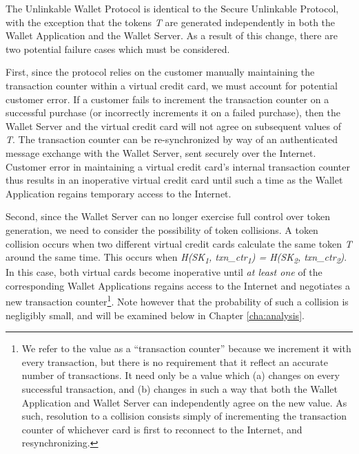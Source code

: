 The Unlinkable Wallet Protocol is identical to the Secure Unlinkable Protocol,
    with the exception that the tokens \emph{T} are generated independently in both the Wallet Application and the Wallet Server.
As a result of this change, there are two potential failure cases which must be considered.

First, since the protocol relies on the customer manually maintaining the transaction counter within a virtual credit card,
    we must account for potential customer error.
If a customer fails to increment the transaction counter on a successful purchase (or incorrectly increments it on a failed purchase),
    then the Wallet Server and the virtual credit card will not agree on subsequent values of \emph{T}.
The transaction counter can be re-synchronized by way of an authenticated message exchange with the Wallet Server, sent securely over the Internet.
Customer error in maintaining a virtual credit card's internal transaction counter thus results in an inoperative virtual credit card
    until such a time as the Wallet Application regains temporary access to the Internet.

Second, since the Wallet Server can no longer exercise full control over token generation, we need to consider the possibility of token collisions.
A token collision occurs when two different virtual credit cards calculate the same token \emph{T} around the same time.
This occurs when \emph{H(SK\textsubscript{1}, txn\_ctr\textsubscript{1}) = H(SK\textsubscript{2}, txn\_ctr\textsubscript{2})}.
In this case, both virtual cards become inoperative until \emph{at least one} of the corresponding Wallet Applications regains access to the Internet
    and negotiates a new transaction counter\footnote{
    We refer to the value as a ``transaction counter'' because we increment it with every transaction,
        but there is no requirement that it reflect an accurate number of transactions.
    It need only be a value which (a) changes on every successful transaction, and
        (b) changes in such a way that both the Wallet Application and Wallet Server can independently agree on the new value.
    As such, resolution to a collision consists simply of incrementing the transaction counter of whichever card is first to reconnect to the Internet, and resynchronizing.
    }.
Note however that the probability of such a collision is negligibly small, and will be examined below in Chapter \ref{cha:analysis}.